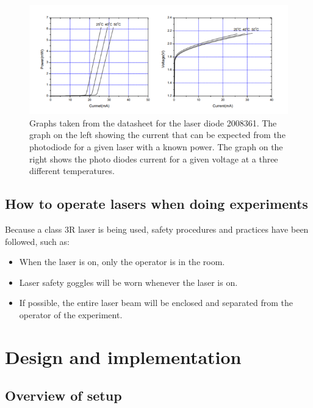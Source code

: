 \documentclass[conference]{IEEEtran}
\begin{document}
\begin{figure}[h!]
\includegraphics[width=\linewidth]{Fig 1.png}\par
\caption{Graphs taken from the datasheet for the laser diode 2008361. The graph on the left showing the current that can be expected from the photodiode for a given laser with a known power. The graph on the right shows the photo diodes current for a given voltage at a three different temperatures.}
\label{fig}
\end{figure}

\subsection{How to operate lasers when doing experiments}

Because a class 3R laser is being used, safety procedures and practices have been followed, such as: 

\begin{itemize}
    \item When the laser is on, only the operator is in the room.
    \item Laser safety goggles will be worn whenever the laser is on.
    \item If possible, the entire laser beam will be enclosed and separated from the operator of the experiment.
\end{itemize}

\section{Design and implementation}

\subsection{Overview of setup}
\end{document}
